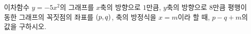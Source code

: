 이차함수 $y=-5x^2$의 그래프를 $x$축의 방향으로 $1$만큼, $y$축의 방향으로 $8$만큼 평행이동한 그래프의 꼭짓점의 좌표를 $(p{,}\mkern3mu\mathopen{}q)$, 축의 방정식을 $x=m$이라 할 때, $p-q+m$의 값을 구하시오.
